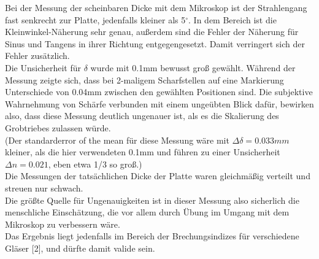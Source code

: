 \documentclass[12pt,a4paper]{article}
\begin{document}
\begin{multicols}{2}
Bei der Messung der scheinbaren Dicke mit dem Mikroskop ist der Strahlengang fast senkrecht zur Platte, jedenfalls kleiner als 5$^\circ$. In dem Bereich ist die Kleinwinkel-Näherung sehr genau, außerdem sind die Fehler der Näherung für Sinus und Tangens in ihrer Richtung entgegengesetzt. Damit verringert sich der Fehler zusätzlich.\\
Die Unsicherheit für $\delta$ wurde mit 0.1mm bewusst groß gewählt. Während der Messung zeigte sich, dass bei 2-maligem Scharfstellen auf eine Markierung Unterschiede von  0.04mm zwischen den gewählten Positionen sind. Die subjektive Wahrnehmung von Schärfe verbunden mit einem ungeübten Blick dafür, bewirken also, dass diese Messung deutlich ungenauer ist, als es die Skalierung des Grobtriebes zulassen würde. \\
(Der standarderror of the mean für diese Messung wäre mit $\Delta \delta = 0.033mm$ kleiner, als die hier verwendeten 0.1mm und führen zu einer Unsicherheit $\Delta n = 0.021$, eben etwa 1/3 so groß.)\\
Die Messungen der tatsächlichen Dicke der Platte waren gleichmäßig verteilt und streuen nur schwach.\\
Die größte Quelle für Ungenauigkeiten ist in dieser Messung also sicherlich die menschliche Einschätzung, die vor allem durch Übung im Umgang mit dem Mikroskop zu verbessern wäre.\\
Das Ergebnis liegt jedenfalls im Bereich der Brechungsindizes für verschiedene Gläser [2], und dürfte damit valide sein.



\end{multicols}
\end{document}
